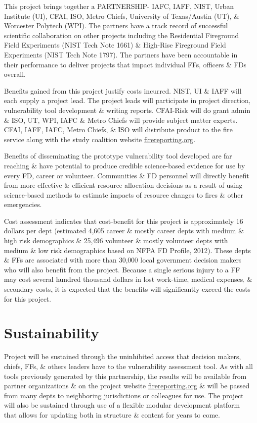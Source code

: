 \documentclass[12pt,letterpaper]{article}
\begin{document}
This project brings together a PARTNERSHIP- IAFC, IAFF, NIST, Urban Institute (UI), CFAI, ISO, Metro Chiefs, University of Texas/Austin (UT), \& Worcester Polytech (WPI). The partners have a track record of successful scientific collaboration on other projects including the Residential Fireground Field Experiments (NIST Tech Note 1661) \& High-Rise Fireground Field Experiments (NIST Tech Note 1797).  The partners have been accountable in their performance to deliver projects that impact individual FFs, officers \& FDs overall.  

Benefits gained from this project justify costs incurred.  NIST, UI \& IAFF will each supply a project lead. The project leads will participate in project direction, vulnerability tool development \& writing reports. CFAI-Risk will do grant admin \& ISO, UT, WPI, IAFC \& Metro Chiefs will provide subject matter experts.  CFAI, IAFF, IAFC, Metro Chiefs, \& ISO will distribute product to the fire service along with the study coalition website \href{www.firereporting.org}{firereporting.org}. 

Benefits of disseminating the prototype vulnerability tool developed are far reaching \& have potential to produce credible science-based evidence for use by every FD, career or volunteer. Communities \& FD personnel will directly benefit from more effective \& efficient resource allocation decisions as a result of using science-based methods to estimate impacts of resource changes to fires \& other emergencies.

Cost assessment indicates that cost-benefit for this project is approximately 16 dollars per dept (estimated 4,605 career \& mostly career depts with medium \& high risk demographics \& 25,496 volunteer \& mostly volunteer depts with medium \& low risk demographics based on NFPA FD Profile, 2012). These depts \& FFs are associated with more than 30,000 local government decision makers who will also benefit from the project.  Because a single serious injury to a FF may cost several hundred thousand dollars in lost work-time, medical expenses, \& secondary costs, it is expected that the benefits will significantly exceed the costs for this project.


\section{Sustainability}
\label{sec:sustain}
Project will be sustained through the uninhibited access that decision makers, chiefs, FFs, \& others leaders have to the vulnerability assessment tool. As with all tools previously generated by this partnership, the results will be available from partner organizations \& on the project website \href{www.firereporting.org}{firereporting.org} \& will be passed from many depts to neighboring jurisdictions or colleagues for use.  The project will also be sustained through use of a flexible modular development platform that allows for updating both in structure \& content for years to come.
\end{document}
